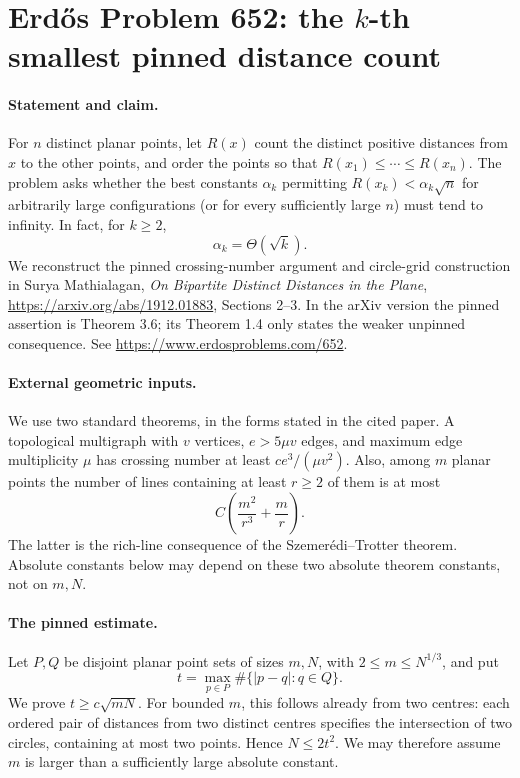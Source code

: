\section*{Erd\H{o}s Problem 652: the \(k\)-th smallest pinned distance count}

\paragraph{Statement and claim.}
For \(n\) distinct planar points, let \(R(x)\) count the distinct
positive distances from \(x\) to the other points, and order the
points so that \(R(x_1)\leq\cdots\leq R(x_n)\).
The problem asks whether the best constants \(\alpha_k\) permitting
\(R(x_k)<\alpha_k\sqrt n\) for arbitrarily large configurations
(or for every sufficiently large \(n\)) must tend to infinity.
In fact, for \(k\geq2\),
\[
 \alpha_k=\Theta(\sqrt k).
\]
We reconstruct the pinned crossing-number argument and circle-grid
construction in Surya Mathialagan,
\emph{On Bipartite Distinct Distances in the Plane},
\url{https://arxiv.org/abs/1912.01883}, Sections 2--3.
In the arXiv version the pinned assertion is Theorem 3.6;
its Theorem 1.4 only states the weaker unpinned consequence.
See \url{https://www.erdosproblems.com/652}.

\paragraph{External geometric inputs.}
We use two standard theorems, in the forms stated in the cited paper.
A topological multigraph with \(v\) vertices, \(e>5\mu v\) edges,
and maximum edge multiplicity \(\mu\) has crossing number at least
\(c e^3/(\mu v^2)\).
Also, among \(m\) planar points the number of lines containing at
least \(r\geq2\) of them is at most
\[
 C\left(\frac{m^2}{r^3}+\frac mr\right).
\]
The latter is the rich-line consequence of the
Szemer\'edi--Trotter theorem. Absolute constants below may depend
on these two absolute theorem constants, not on \(m,N\).

\paragraph{The pinned estimate.}
Let \(P,Q\) be disjoint planar point sets of sizes \(m,N\), with
\(2\leq m\leq N^{1/3}\), and put
\[
 t=\max_{p\in P}\#\{|p-q|:q\in Q\}.
\]
We prove \(t\geq c\sqrt{mN}\).
For bounded \(m\), this follows already from two centres:
each ordered pair of distances from two distinct centres specifies
the intersection of two circles, containing at most two points.
Hence \(N\leq2t^2\).
We may therefore assume \(m\) is larger than a sufficiently large
absolute constant.


